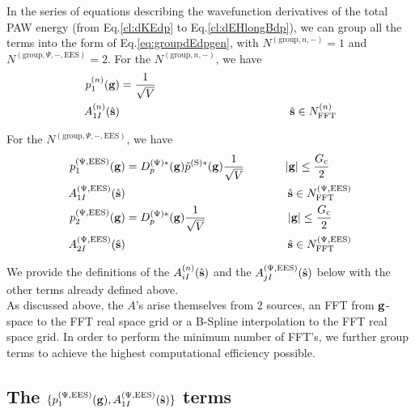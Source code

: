 \documentclass[paper=a4, fontsize=11pt]{article} %
\numberwithin{equation}{section} %
\numberwithin{figure}{section} %
\numberwithin{table}{section} %
\newcommand{\bg}{{\bf{g}}}
\newcommand{\hs}{{\hat{\bf{s}}}}
\newcommand{\rS}{{\mathrm{S}}}
\newcommand{\rEES}{{\mathrm{EES}}}
\newcommand{\rgr}{{\mathrm{group}}}
\newcommand{\NFFTn}{{N^{(n)}_{\mathrm{FFT}}}}
\newcommand{\NFFTpEES}{{N^{\mathrm{(\Psi,\rEES})}_{\mathrm{FFT}}}}
\newcommand{\hGc}{{\frac{G_{\mathrm{c}}}{2}}}
\newcommand{\Dpgc}{{D^{(\Psi)*}_p(\bg)}}
\newcommand{\hsinpEES}{{\ \ \ \ \hs \in \NFFTpEES}}
\newcommand{\hsinn}{{\ \ \ \ \hs \in \NFFTn}}
\begin{document}
In the series of equations describing the wavefunction derivatives of the total PAW energy (from Eq.\eqref{cl:dKEdp} to Eq.\eqref{cl:dEHlongBdp}), we can group all the terms into the form of Eq.\eqref{eq:groupdEdpgen}, with $N^{(\rgr,n,-)}=1$ and \\$N^{(\rgr,\Psi,-,\rEES)}=2$. For the $N^{(\rgr,n,-)}$, we have
\begin{equation}\label{eq:groupdEdpgenn}
\begin{split}
p_1^{(n)}(\bg) &= \frac{1}{\sqrt{V}} \\
A_{1I}^{(n)}(\hs) &\hspace*{1.9in} \hsinn \\
\end{split}
\end{equation}

For the $N^{(\rgr,\Psi,-,\rEES)}$, we have
\begin{equation}\label{eq:groupdEdpgenp}
\begin{split}
p_1^{(\Psi,\rEES)}(\bg) &= \Dpgc \tilde p^{(\rS)*}(\bg)\frac{1}{\sqrt{V}}\hspace*{0.5in}|\bg| \leq \hGc \\
A_{1I}^{(\Psi,\rEES)}(\hs) &\hspace*{1.8in}\hsinpEES \\
p_2^{(\Psi,\rEES)}(\bg) &= \Dpgc \frac{1}{\sqrt{V}}\hspace*{1.0in} |\bg| \leq \hGc \\
A_{2I}^{(\Psi,\rEES)}(\hs) &\hspace*{1.8in} \hsinpEES \\
\end{split}
\end{equation}

We provide the definitions of the $A_{iI}^{(n)}(\hs)$ and the $A_{jI}^{(\Psi,\rEES)}(\hs)$ below with the other terms already defined above.\\

As discussed above, the $A$'s arise themselves from 2 sources, an FFT from $\bg$-space to the FFT real space grid or a B-Spline interpolation to the FFT real space grid. In order to perform the minimum number of FFT's, we further group terms to achieve the highest computational efficiency possible.

\subsection{The $\{p_1^{(\Psi,\rEES)}(\bg), A_{1I}^{(\Psi,\rEES)}(\hs)\}$ terms}
\end{document}
